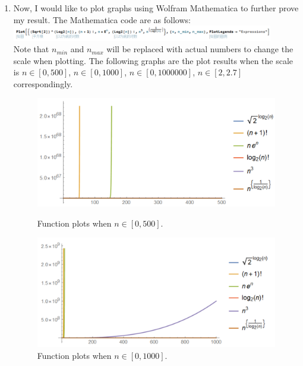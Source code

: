 \documentclass[12pt,a4paper]{article}
\makeatletter
\newtheorem*{solution}{Solution}
\theoremstyle{definition}
\renewenvironment{solution}[1][Solution] {\par\pushQED{\qed}\normalfont\topsep6\p@\@plus6\p@\relax\trivlist\item[\hskip\labelsep\bfseries#1\@addpunct{.}]\ignorespaces}{\popQED\endtrivlist\@endpefalse} \makeatother
\makeatother
\begin{document}
\begin{enumerate}
\begin{solution}
Now, I would like to plot graphs using Wolfram Mathematica to further prove my result.
The Mathematica code are as follows:\\
\includegraphics[width=0.9\textwidth]{f_1.png}\\
Note that $n_{min}$ and $n_{max}$ will be replaced with actual numbers to change the scale when plotting. The following graphs are the plot results when the scale is $n\in[0,500]$, $n\in[0,1000]$, $n\in[0,1000000]$, $n\in[2,2.7]$ correspondingly.\\
\begin{figure}[htbp]
\begin{minipage}[h]{0.5\textwidth}
\centering
\includegraphics[width=1\textwidth]{f1.png}
\caption{Function plots when $n\in[0,500]$.} 
\end{minipage}
\begin{minipage}[h]{0.5\textwidth}
\centering
\includegraphics[width=1\textwidth]{f2.png}
\caption{Function plots when $n\in[0,1000]$.} 
\end{minipage}
\end{figure}


\end{solution}
\end{enumerate}
\end{document}
